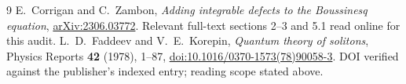 \documentclass[11pt,a4paper]{article}
\begin{document}
\begin{thebibliography}{9}
 E.~Corrigan and C.~Zambon, \emph{Adding integrable defects to the
Boussinesq equation}, \href{https://arxiv.org/abs/2306.03772}{arXiv:2306.03772}.
Relevant full-text sections 2--3 and 5.1 read online for this audit.
 L.~D.~Faddeev and V.~E.~Korepin, \emph{Quantum theory of solitons},
Physics Reports \textbf{42} (1978), 1--87,
\href{https://doi.org/10.1016/0370-1573(78)90058-3}{doi:10.1016/0370-1573(78)90058-3}.
DOI verified against the publisher's indexed entry; reading scope stated above.
\end{thebibliography}
\end{document}
